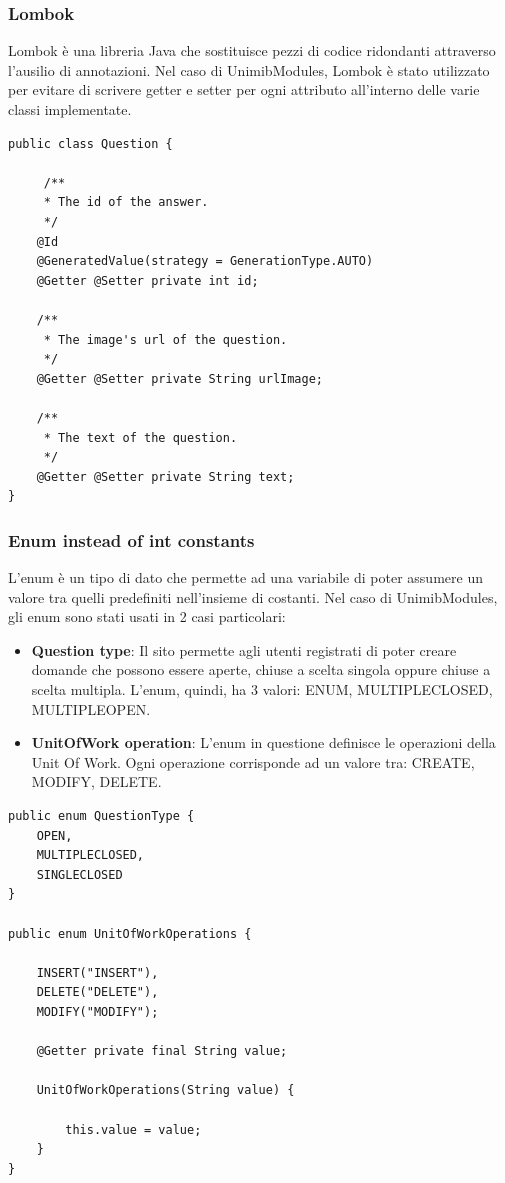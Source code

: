 \documentclass[12pt]{article}
\begin{document}
\subsubsection{Lombok}
Lombok è una libreria Java che sostituisce pezzi di codice ridondanti attraverso l'ausilio di annotazioni. Nel caso di UnimibModules, Lombok è stato utilizzato per evitare di scrivere getter e setter per ogni attributo all'interno delle varie classi implementate.
 \begin{lstlisting}
public class Question {
	
	 /**
     * The id of the answer.
     */
    @Id
    @GeneratedValue(strategy = GenerationType.AUTO)
	@Getter	@Setter private int id;
	
    /**
     * The image's url of the question.
     */
	@Getter	@Setter private String urlImage;
	
	/**
     * The text of the question.
     */
	@Getter	@Setter private String text;
}
\end{lstlisting}

\subsubsection{Enum instead of int constants}
L'enum è un tipo di dato che permette ad una variabile di poter assumere un valore tra quelli predefiniti nell'insieme di costanti. Nel caso di UnimibModules, gli enum sono stati usati in 2 casi particolari:
\begin{itemize}
    \item \textbf{Question type}: Il sito permette agli utenti registrati di poter creare domande che possono essere aperte, chiuse a scelta singola oppure chiuse a scelta multipla. L'enum, quindi, ha 3 valori: ENUM, MULTIPLECLOSED, MULTIPLEOPEN.
    \item \textbf{UnitOfWork operation}: L'enum in questione definisce le operazioni della Unit Of Work. Ogni operazione corrisponde ad un valore tra: CREATE, MODIFY, DELETE.
\end{itemize}
 \begin{lstlisting}
public enum QuestionType {
    OPEN,
    MULTIPLECLOSED,
    SINGLECLOSED
}

public enum UnitOfWorkOperations {

	INSERT("INSERT"),
	DELETE("DELETE"),
	MODIFY("MODIFY");

	@Getter	private final String value;

	UnitOfWorkOperations(String value) {

		this.value = value;
	}
}
\end{lstlisting}
\end{document}
